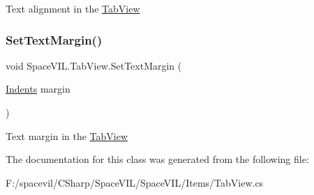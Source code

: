 Text alignment in the \mbox{\hyperlink{class_space_v_i_l_1_1_tab_view}{Tab\+View}} 

\mbox{\label{class_space_v_i_l_1_1_tab_view_af857743fb5c8b39d4090b5ae49f7abd5}} 
\subsubsection{\texorpdfstring{Set\+Text\+Margin()}{SetTextMargin()}}
{\footnotesize\ttfamily void Space\+V\+I\+L.\+Tab\+View.\+Set\+Text\+Margin (\begin{DoxyParamCaption}\item[{\mbox{\hyperlink{struct_space_v_i_l_1_1_decorations_1_1_indents}{Indents}}}]{margin }\end{DoxyParamCaption})\hspace{0.3cm}{\ttfamily [inline]}}



Text margin in the \mbox{\hyperlink{class_space_v_i_l_1_1_tab_view}{Tab\+View}} 



The documentation for this class was generated from the following file\+:\begin{DoxyCompactItemize}
\item 
F\+:/spacevil/\+C\+Sharp/\+Space\+V\+I\+L/\+Space\+V\+I\+L/\+Items/Tab\+View.\+cs\end{DoxyCompactItemize}
